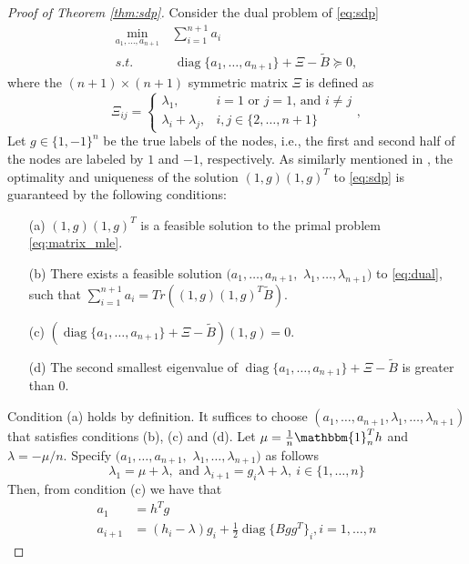 \documentclass[conference]{IEEEtran}
\DeclareMathOperator{\diag}{diag}
\begin{document}
	\begin{proof}[Proof of Theorem \ref{thm:sdp}]
	Consider the dual problem of \eqref{eq:sdp}
	\begin{align}
		\min_{a_1, \dots, a_{n+1}}\, &\sum_{i=1}^{n+1} a_i \nonumber\\\label{eq:dual}
		s.t. &\, \diag\{a_1, \dots, a_{n+1}\} + \Xi - \widetilde{B} \succeq 0, 
	\end{align}
	where the $(n+1)\times (n+1)$ symmetric matrix $\Xi$ is defined as 
	\begin{equation}
		\Xi_{ij} = \begin{cases}
			\lambda_1, & i=1\text{ or }j=1 \text{, and }i\ne j\\
			\lambda_i + \lambda_j, & i, j\in\{2,\ldots,n+1\}
		\end{cases},
	\end{equation}
	Let $g\in\{1,-1\}^n$ be the true labels of the nodes, i.e., the first and second half of the nodes are labeled by $1$ and $-1$, respectively. As similarly mentioned in \cite{abbe2015exact},
	the optimality and uniqueness of the solution $(1,g)(1,g)^T$ to \eqref{eq:sdp} is guaranteed by the following conditions: 
	\begin{enumerate}
		\item[(a)] $(1,g)(1,g)^T$ is a feasible solution to the primal problem \eqref{eq:matrix_mle}.
		\item[(b)] There exists a feasible solution $(a_1,\ldots,a_{n+1},$ $\lambda_1,\ldots,\lambda_{n+1})$ to \eqref{eq:dual}, such that $\sum_{i=1}^{n+1} a_i=Tr((1,g)(1,g)^T\widetilde{B})$.
		\item[(c)] $(\diag\{a_1, \dots, a_{n+1}\} + \Xi - \widetilde{B})(1,g)=0$.
		\item[(d)] The second smallest eigenvalue of $\diag\{a_1, \dots, a_{n+1}\} + \Xi - \widetilde{B}$ is greater than $0$. 
	\end{enumerate}
	Condition (a) holds by definition. It suffices to choose $(a_1,\ldots,a_{n+1},\lambda_1,\ldots,\lambda_{n+1})$ that satisfies conditions (b), (c) and (d).
	Let $\mu=\frac{1}{n}\mathbbm{1}_n^T h$ and $\lambda = -\mu/n$. Specify $(a_1,\ldots,a_{n+1},$ $\lambda_1,\ldots,\lambda_{n+1})$ as follows
	$$\lambda_1=\mu+\lambda, \text{ and }\lambda_{i+1}=g_i\lambda + \lambda,~i\in\{1,\ldots,n\}$$
	Then, from condition (c) we have that
	\begin{align}
		a_1 &= h^T g \nonumber\\
		a_{i+1} & = (h_i -\lambda)g_i  + \frac{1}{2}\diag\{Bgg^T\}_i, i = 1, \dots, n
	\end{align}

\end{proof}
\end{document}
